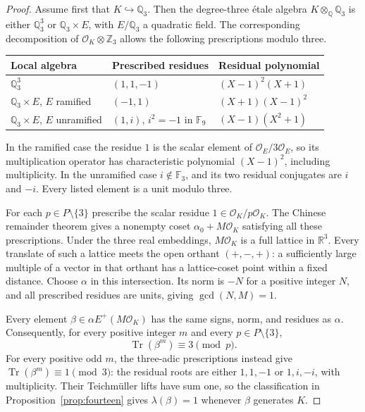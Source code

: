 \documentclass[11pt,a4paper]{article}
\theoremstyle{remark}\newtheorem{remark}[theorem]{Remark}
\newcommand{\Z}{\mathbb Z}\newcommand{\Q}{\mathbb Q}
\newcommand{\R}{\mathbb R}\newcommand{\F}{\mathbb F}
\newcommand{\Tr}{\operatorname{Tr}}\newcommand{\Nm}{\operatorname{N}}
\begin{document}
\begin{proof}
Assume first that $K\hookrightarrow\Q_3$. Then the degree-three
\'{e}tale algebra $K\otimes_\Q\Q_3$ is either
$\Q_3^3$ or $\Q_3\times E$, with $E/\Q_3$ a quadratic field.
The corresponding decomposition of $\mathcal O_K\otimes\Z_3$
allows the following prescriptions modulo three.
\begin{center}\small
\begin{tabular}{lll}
\toprule
Local algebra & Prescribed residues & Residual polynomial\\
\midrule
$\Q_3^3$ & $(1,1,-1)$ & $(X-1)^2(X+1)$\\
$\Q_3\times E$, $E$ ramified & $(-1,1)$ & $(X+1)(X-1)^2$\\
$\Q_3\times E$, $E$ unramified & $(1,i)$, $i^2=-1$ in $\F_9$ & $(X-1)(X^2+1)$\\
\bottomrule
\end{tabular}
\end{center}
In the ramified case the residue $1$ is the scalar element of
$\mathcal O_E/3\mathcal O_E$, so its multiplication operator has
characteristic polynomial $(X-1)^2$, including multiplicity. In the
unramified case $i\notin\F_3$, and its two residual conjugates
are $i$ and $-i$. Every listed element is a unit modulo three.

For each $p\in P\setminus\{3\}$ prescribe the scalar residue
$1\in\mathcal O_K/p\mathcal O_K$. The Chinese remainder theorem
gives a nonempty coset $\alpha_0+M\mathcal O_K$ satisfying all
these prescriptions. Under the three real embeddings,
$M\mathcal O_K$ is a full lattice in $\R^3$. Every translate of
such a lattice meets the open orthant $(+,-,+)$: a sufficiently
large multiple of a vector in that orthant has a lattice-coset
point within a fixed distance. Choose $\alpha$ in this intersection.
Its norm is $-N$ for a positive integer $N$, and all prescribed
residues are units, giving $\gcd(N,M)=1$.

Every element $\beta\in\alpha E^+(M\mathcal O_K)$ has the same
signs, norm, and residues as $\alpha$. Consequently, for every
positive integer $m$ and every $p\in P\setminus\{3\}$,
\[
 \Tr(\beta^m)\equiv3\pmod p.
\]
For every positive odd $m$, the three-adic prescriptions instead
give $\Tr(\beta^m)\equiv1\pmod3$: the residual roots are either
$1,1,-1$ or $1,i,-i$, with multiplicity. Their Teichm\"uller
lifts have sum one, so the classification in
Proposition~\ref{prop:fourteen} gives $\lambda(\beta)=1$ whenever
$\beta$ generates $K$.


\end{proof}
\end{document}
